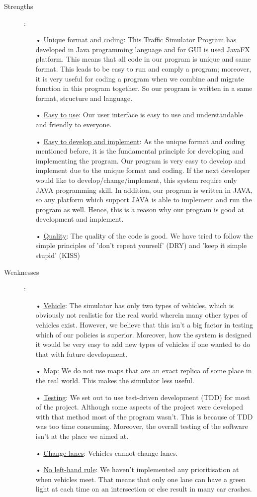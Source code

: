 \documentclass[11pt]{article}
\begin{document}
\begin{description}
\item[Strengths]:
	\begin{itemize}
	\item[•] \underline{Unique format and coding}: This Traffic Simulator Program has developed in Java programming language and for GUI is used JavaFX platform. This means that all code in our program is unique and same format. This leads to be easy to run and comply a program; moreover, it is very useful for coding a program when we combine and migrate function in this program together. So our program is written in a same format, structure and language.
	\item[•] \underline{Easy to use}: Our user interface is easy to use and understandable and friendly to everyone.
	\item[•] \underline{Easy to develop and implement}: As the unique format and coding mentioned before, it is the fundamental principle for developing and implementing the program. Our program is very easy to develop and implement due to the unique format and coding. If the next developer would like to develop/change/implement, this system require only JAVA programming skill. In addition, our program is written in JAVA, so any platform which support JAVA is able to implement and run the program as well. Hence, this is a reason why our program is good at development and implement.
	\item[•] \underline{Quality}: The quality of the code is good. We have tried to follow the simple principles of 'don't repeat yourself' (DRY) and 'keep it simple stupid' (KISS) 
  	\end{itemize}				

\item[Weaknesses]:
	\begin{itemize}
	\item[•] \underline{Vehicle}: The simulator has only two types of vehicles, which is obviously not realistic for the real world wherein many other types of vehicles exist. However, we believe that this isn't a big factor in testing which of our policies is superior. Moreover, how the system is designed it would be very easy to add new types of vehicles if one wanted to do that with future development.
	\item[•] \underline{Map}: We do not use maps that are an exact replica of some place in the real world. This makes the simulator less useful.
	\item[•] \underline{Testing}: We set out to use test-driven development (TDD) for most of the project. Although some aspects of the project were developed with that method most of the program wasn't. This is because of TDD was too time consuming. Moreover, the overall testing of the software isn't at the place we aimed at.
	\item[•] \underline{Change lanes}: Vehicles cannot change lanes.
	\item[•] \underline{No left-hand rule}: We haven't implemented any prioritisation at when vehicles meet. That means that only one lane can have a green light at each time on an intersection or else result in many car crashes. 
  	\end{itemize}					


\end{description}
\end{document}
